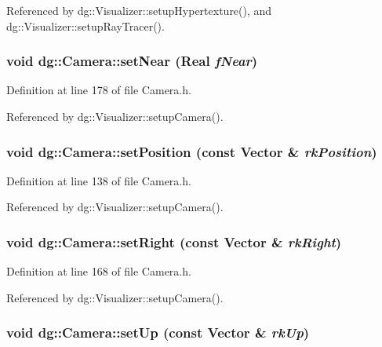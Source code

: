 Referenced by dg::Visualizer::setup\-Hypertexture(), and dg::Visualizer::setup\-Ray\-Tracer().
\subsubsection{\setlength{\rightskip}{0pt plus 5cm}void dg::Camera::set\-Near ({\bf Real} {\em f\-Near})\hspace{0.3cm}{\tt  [inline]}}\label{classdg_1_1Camera_a11}




Definition at line 178 of file Camera.h.

Referenced by dg::Visualizer::setup\-Camera().
\subsubsection{\setlength{\rightskip}{0pt plus 5cm}void dg::Camera::set\-Position (const {\bf Vector} \& {\em rk\-Position})\hspace{0.3cm}{\tt  [inline]}}\label{classdg_1_1Camera_a4}




Definition at line 138 of file Camera.h.

Referenced by dg::Visualizer::setup\-Camera().
\subsubsection{\setlength{\rightskip}{0pt plus 5cm}void dg::Camera::set\-Right (const {\bf Vector} \& {\em rk\-Right})\hspace{0.3cm}{\tt  [inline]}}\label{classdg_1_1Camera_a10}




Definition at line 168 of file Camera.h.

Referenced by dg::Visualizer::setup\-Camera().
\subsubsection{\setlength{\rightskip}{0pt plus 5cm}void dg::Camera::set\-Up (const {\bf Vector} \& {\em rk\-Up})\hspace{0.3cm}{\tt  [inline]}}\label{classdg_1_1Camera_a8}




